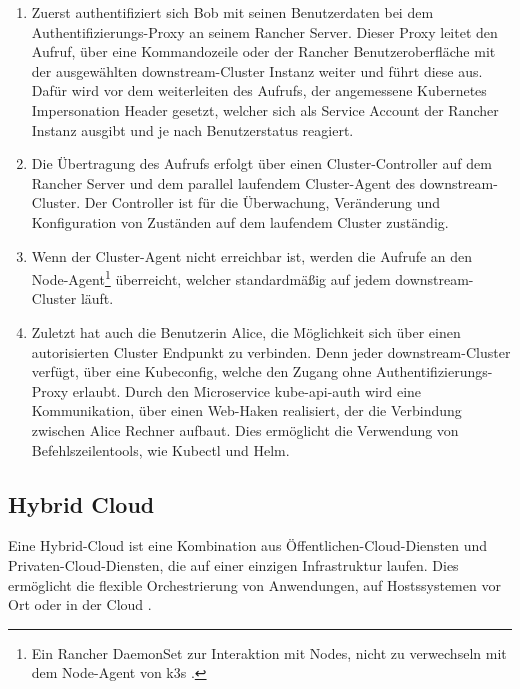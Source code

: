 \begin{enumerate}
\item Zuerst authentifiziert sich Bob mit seinen Benutzerdaten bei dem Authentifizierungs-Proxy an seinem Rancher Server.
Dieser Proxy leitet den Aufruf, über eine Kommandozeile oder der Rancher Benutzeroberfläche mit der ausgewählten downstream-Cluster Instanz weiter und führt diese aus.
Dafür wird vor dem weiterleiten des Aufrufs, der angemessene Kubernetes Impersonation Header gesetzt, 
welcher sich als Service Account der Rancher Instanz ausgibt und je nach Benutzerstatus reagiert.   
\item Die Übertragung des Aufrufs erfolgt über einen Cluster-Controller auf dem Rancher Server
und dem parallel laufendem Cluster-Agent des downstream-Cluster. Der Controller ist für die Überwachung, Veränderung
und Konfiguration von Zuständen auf dem laufendem Cluster zuständig. 
\item Wenn der Cluster-Agent nicht erreichbar ist,
werden die Aufrufe an den Node-Agent\footnote{Ein Rancher DaemonSet zur Interaktion mit Nodes, 
nicht zu verwechseln mit dem Node-Agent von k3s \cite{rancherAgents}. } überreicht, welcher standardmäßig auf jedem downstream-Cluster läuft.
\item Zuletzt hat auch die Benutzerin Alice, die Möglichkeit sich über einen autorisierten Cluster Endpunkt zu verbinden.
Denn jeder downstream-Cluster verfügt, über eine Kubeconfig, welche den Zugang ohne Authentifizierungs-Proxy erlaubt.
Durch den Microservice kube-api-auth wird eine Kommunikation, über einen Web-Haken realisiert, der die Verbindung
zwischen Alice Rechner aufbaut. 
Dies ermöglicht die Verwendung von Befehlszeilentools, wie Kubectl und Helm.
\end{enumerate}

\subsection{Hybrid Cloud}
Eine Hybrid-Cloud ist eine Kombination aus Öffentlichen-Cloud-Diensten und Privaten-Cloud-Diensten, die auf einer einzigen Infrastruktur laufen.
Dies ermöglicht die flexible Orchestrierung von Anwendungen, auf Hostssystemen vor Ort oder in der Cloud \cite{ibmHybrid}.

